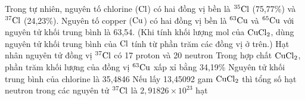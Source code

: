 \documentclass[11pt,a4paper]{article}
\begin{document}
\begin{ex}
Trong tự nhiên, nguyên tố chlorine ($\ce{Cl}$) có hai đồng vị bền là $^{35}\ce{Cl}$ (75,77\%) và $^{37}\ce{Cl}$ (24,23\%). Nguyên tố copper ($\ce{Cu}$) có hai đồng vị bền là $^{63}\ce{Cu}$ và $^{65}\ce{Cu}$ với nguyên tử khối trung bình là 63,54. (Khi tính khối lượng mol của $\ce{CuCl2}$, dùng nguyên tử khối trung bình của $\ce{Cl}$ tính từ phần trăm các đồng vị ở trên.)
\choiceTF
{\True Hạt nhân nguyên tử đồng vị $^{37}\ce{Cl}$ có 17 proton và 20 neutron}
{\True Trong hợp chất $\ce{CuCl2}$, phần trăm khối lượng của đồng vị $^{63}\ce{Cu}$ xấp xỉ bằng 34,19\%}
{\True Nguyên tử khối trung bình của chlorine là 35,4846}
{Nếu lấy 13,45092 gam $\ce{CuCl2}$ thì tổng số hạt neutron trong các nguyên tử $^{37}\ce{Cl}$ là $2,91826 \times 10^{23}$ hạt}

\end{ex}
\end{document}
